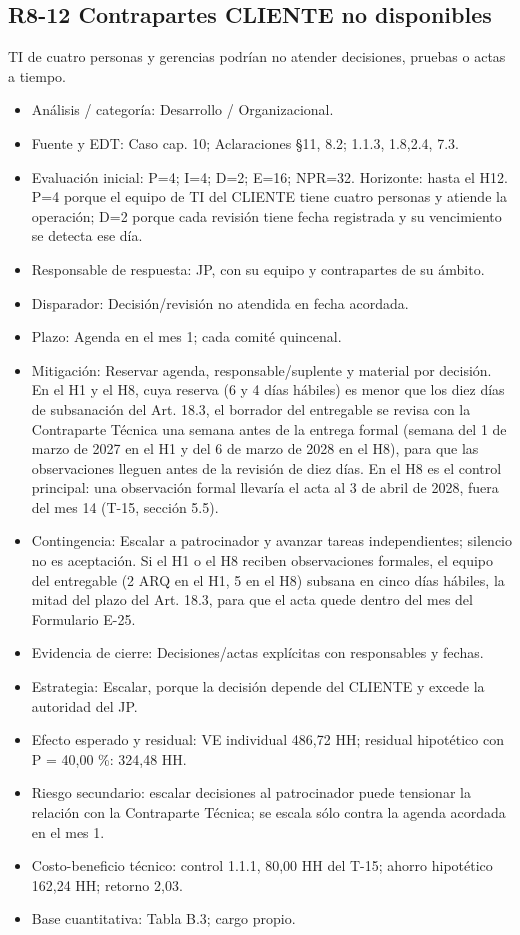 \subsection*{R8-12 \textemdash{} Contrapartes CLIENTE no disponibles}

TI de cuatro personas y gerencias podrían no atender decisiones, pruebas o actas a tiempo.

\begin{itemize}[leftmargin=*,itemsep=3pt]
\item Análisis / categoría: Desarrollo / Organizacional.
\item Fuente y EDT: Caso cap. 10; Aclaraciones §11, 8.2; 1.1.3, 1.8,2.4, 7.3.
\item Evaluación inicial: P=4; I=4; D=2; E=16; NPR=32. Horizonte: hasta el H12. P=4 porque el equipo de TI del CLIENTE tiene cuatro personas y atiende la operación; D=2 porque cada revisión tiene fecha registrada y su vencimiento se detecta ese día.
\item Responsable de respuesta: JP, con su equipo y contrapartes de su ámbito.
\item Disparador: Decisión/revisión no atendida en fecha acordada.
\item Plazo: Agenda en el mes 1; cada comité quincenal.
\item Mitigación: Reservar agenda, responsable/suplente y material por decisión. En el H1 y el H8, cuya reserva (6 y 4 días hábiles) es menor que los diez días de subsanación del Art. 18.3, el borrador del entregable se revisa con la Contraparte Técnica una semana antes de la entrega formal (semana del 1 de marzo de 2027 en el H1 y del 6 de marzo de 2028 en el H8), para que las observaciones lleguen antes de la revisión de diez días. En el H8 es el control principal: una observación formal llevaría el acta al 3 de abril de 2028, fuera del mes 14 (T-15, sección 5.5).
\item Contingencia: Escalar a patrocinador y avanzar tareas independientes; silencio no es aceptación. Si el H1 o el H8 reciben observaciones formales, el equipo del entregable (2 ARQ en el H1, 5 en el H8) subsana en cinco días hábiles, la mitad del plazo del Art. 18.3, para que el acta quede dentro del mes del Formulario E-25.
\item Evidencia de cierre: Decisiones/actas explícitas con responsables y fechas.
\item Estrategia: Escalar, porque la decisión depende del CLIENTE y excede la autoridad del JP.
\item Efecto esperado y residual: VE individual 486,72 HH; residual hipotético con P = 40,00 \%: 324,48 HH.
\item Riesgo secundario: escalar decisiones al patrocinador puede tensionar la relación con la Contraparte Técnica; se escala sólo contra la agenda acordada en el mes 1.
\item Costo-beneficio técnico: control 1.1.1, 80,00 HH del T-15; ahorro hipotético 162,24 HH; retorno 2,03.
\item Base cuantitativa: Tabla B.3; cargo propio.
\end{itemize}


